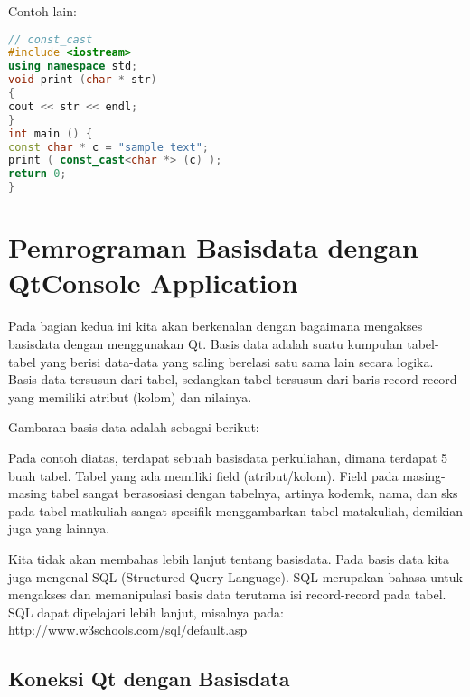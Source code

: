 Contoh lain:

\begin{lstlisting}[language=c++, numbers=none]
// const_cast
#include <iostream>
using namespace std;
void print (char * str)
{
cout << str << endl;
}
int main () {
const char * c = "sample text";
print ( const_cast<char *> (c) );
return 0;
}
\end{lstlisting}

\section{Pemrograman Basisdata dengan QtConsole
Application}\label{pemrograman-basisdata-dengan-qtconsole-application}

Pada bagian kedua ini kita akan berkenalan dengan bagaimana mengakses
basisdata dengan menggunakan Qt. Basis data adalah suatu kumpulan
tabel-tabel yang berisi data-data yang saling berelasi satu sama lain
secara logika. Basis data tersusun dari tabel, sedangkan tabel tersusun
dari baris record-record yang memiliki atribut (kolom) dan nilainya.

Gambaran basis data adalah sebagai berikut:

Pada contoh diatas, terdapat sebuah basisdata perkuliahan, dimana
terdapat 5 buah tabel. Tabel yang ada memiliki field (atribut/kolom).
Field pada masing-masing tabel sangat berasosiasi dengan tabelnya,
artinya kodemk, nama, dan sks pada tabel matkuliah sangat spesifik
menggambarkan tabel matakuliah, demikian juga yang lainnya.

Kita tidak akan membahas lebih lanjut tentang basisdata. Pada basis data
kita juga mengenal SQL (Structured Query Language). SQL merupakan bahasa
untuk mengakses dan memanipulasi basis data terutama isi record-record
pada tabel. SQL dapat dipelajari lebih lanjut, misalnya pada:
http://www.w3schools.com/sql/default.asp

\subsection{Koneksi Qt dengan
Basisdata}\label{koneksi-qt-dengan-basisdata}


